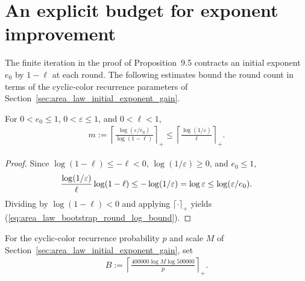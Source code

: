 \section{An explicit budget for exponent improvement}
\label{sec:area_law_bootstrap_round_bound}

The finite iteration in the proof of Proposition~9.5
\cite[lines~788--803]{OpenAI2026AreaLaw} contracts an initial exponent
$e_0$ by $1-\ell$ at each round. The following estimates bound the round count
in terms of the cyclic-color recurrence parameters of
Section~\ref{sec:area_law_initial_exponent_gain}.

\begin{lemma}
    \label{thm:area_law_bootstrap_round_log_bound}
    \leanok
    For $0<e_0\le1$, $0<\varepsilon\le1$, and $0<\ell<1$,
    \begin{align}
        m:=\left\lceil\frac{\log(\varepsilon/e_0)}{\log(1-\ell)}\right\rceil_+
        \le\left\lceil\frac{\log(1/\varepsilon)}{\ell}\right\rceil_+.
        \label{eq:area_law_bootstrap_round_log_bound}
    \end{align}
\end{lemma}
\begin{proof}\leanok
    Since $\log(1-\ell)\le-\ell<0$, $\log(1/\varepsilon)\ge0$, and $e_0\le 1$,
    \begin{align}
        \frac{\log(1/\varepsilon)}{\ell}\log(1-\ell)
        \le-\log(1/\varepsilon)=\log\varepsilon
        \le\log(\varepsilon/e_0).\notag
    \end{align}
    Dividing by $\log(1-\ell)<0$ and applying $\lceil\cdot\rceil_+$ yields
    (\ref{eq:area_law_bootstrap_round_log_bound}).
\end{proof}

\begin{definition}
    \label{def:area_law_initial_round_budget}
    \leanok
    For the cyclic-color recurrence probability $p$ and scale $M$ of
    Section~\ref{sec:area_law_initial_exponent_gain}, set
    \begin{align}
        B:=\left\lceil\frac{400000\log M\log500000}{p}\right\rceil_+.
        \label{eq:area_law_initial_round_budget}
    \end{align}
\end{definition}

